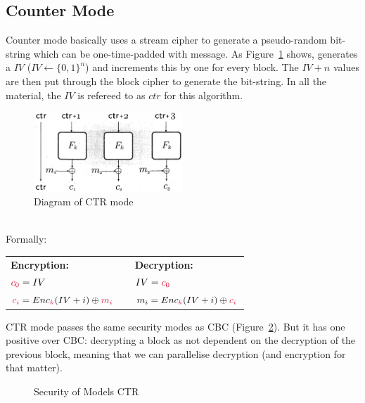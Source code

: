     \subsection{Counter Mode}
    Counter mode basically uses a stream cipher to generate a pseudo-random bit-string which can be one-time-padded with message. As Figure~\ref{fig:ctr} shows, generates a $IV$ ($IV \leftarrow \{0,1\}^n$) and increments this by one for every block. The $IV+n$ values are then put through the block cipher to generate the bit-string. In all the material, the $IV$ is refereed to as $ctr$ for this algorithm.\\
    \begin{figure}[htp!]
        \centering
        \includegraphics[width=0.5\textwidth]{img/ctr.png}
        \caption{Diagram of CTR mode}
        \label{fig:ctr}
    \end{figure}
    \\
    Formally:
    \begin{center}
        \begin{tabular}{lll}
            \textbf{Encryption:} && \textbf{Decryption:}\\
            $\csubc{0} = IV$ && $IV = \csubc{0}$\\
            $\csubc{i} = Enc_\ck(IV + i) \oplus \csubm{i}$ && $m_i = Enc_\ck(IV + i) \oplus \csubc{i}$
        \end{tabular}
    \end{center}
    CTR mode passes the same security modes as CBC (Figure~\ref{fig:ctr-attacktable}). But it has one positive over CBC: decrypting a block as not dependent on the decryption of the previous block, meaning that we can parallelise decryption (and encryption for that matter).
    \begin{figure}[htp!]
        \centering
        \caption{Security of Models CTR}
        \label{fig:ctr-attacktable}
    \end{figure}





